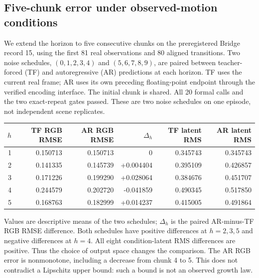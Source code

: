 \subsection{Five-chunk error under observed-motion conditions}
We extend the horizon to five consecutive chunks on the preregistered Bridge
record 15, using the first 81 real observations and 80 aligned transitions.
Two noise schedules, $(0,1,2,3,4)$ and $(5,6,7,8,9)$, are paired between
teacher-forced (TF) and autoregressive (AR) predictions at each horizon.
TF uses the current real frame; AR uses its own preceding floating-point
endpoint through the verified encoding interface. The initial chunk is shared.
All 20 formal calls and the two exact-repeat gates passed. These are two
noise schedules on one episode, not independent scene replicates.

\begin{center}
\small
\begin{tabular}{rrrrrr}
\toprule
$h$ & TF RGB RMSE & AR RGB RMSE & $\Delta_h$ & TF latent RMS & AR latent RMS\\
\midrule
1 & 0.150713 & 0.150713 & 0         & 0.345743 & 0.345743\\
2 & 0.141335 & 0.145739 & +0.004404 & 0.395109 & 0.426857\\
3 & 0.171226 & 0.199290 & +0.028064 & 0.384676 & 0.451707\\
4 & 0.244579 & 0.202720 & -0.041859 & 0.490345 & 0.517850\\
5 & 0.168763 & 0.182999 & +0.014237 & 0.415005 & 0.491864\\
\bottomrule
\end{tabular}
\end{center}
Values are descriptive means of the two schedules; $\Delta_h$ is the paired
AR-minus-TF RGB RMSE difference. Both schedules have positive differences at
$h=2,3,5$ and negative differences at $h=4$. All eight condition-latent RMS
differences are positive. Thus the choice of output space changes the comparison.
The AR RGB error is nonmonotone, including a decrease from chunk 4 to 5.
This does not contradict a Lipschitz upper bound: such a bound is not an
observed growth law.

